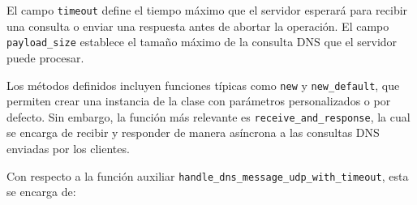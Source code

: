 
El campo \texttt{timeout} define el tiempo máximo que el servidor esperará para recibir una consulta o enviar una respuesta antes de abortar la operación.
El campo \texttt{payload\_size} establece el tamaño máximo de la consulta DNS que el servidor puede procesar.


Los métodos definidos incluyen funciones típicas como \texttt{new} y \texttt{new\_default}, que permiten crear 
una instancia de la clase con parámetros personalizados o por defecto. Sin embargo, la función más relevante es \texttt{receive\_and\_response}, 
la cual se encarga de recibir y responder de manera asíncrona a las consultas DNS enviadas por los clientes.



Con respecto a la función auxiliar \texttt{handle\_dns\_message\_udp\_with\_timeout}, esta se encarga de:

